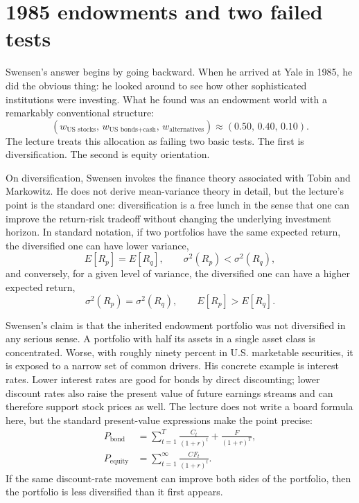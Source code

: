 \section{1985 endowments and two failed tests}

Swensen's answer begins by going backward. When he arrived at Yale in 1985, he did the obvious thing: he looked around to see how other sophisticated institutions were investing. What he found was an endowment world with a remarkably conventional structure:
\begin{equation}
\left(w_{\text{US stocks}},\,w_{\text{US bonds+cash}},\,w_{\text{alternatives}}\right)
\approx (0.50,\,0.40,\,0.10).
\end{equation}
The lecture treats this allocation as failing two basic tests. The first is diversification. The second is equity orientation.

On diversification, Swensen invokes the finance theory associated with Tobin and Markowitz. He does not derive mean-variance theory in detail, but the lecture's point is the standard one: diversification is a free lunch in the sense that one can improve the return-risk tradeoff without changing the underlying investment horizon. In standard notation, if two portfolios have the same expected return, the diversified one can have lower variance,
\begin{equation}
E[R_p]=E[R_q], \qquad \sigma^2(R_p)<\sigma^2(R_q),
\end{equation}
and conversely, for a given level of variance, the diversified one can have a higher expected return,
\begin{equation}
\sigma^2(R_p)=\sigma^2(R_q), \qquad E[R_p]>E[R_q].
\end{equation}

Swensen's claim is that the inherited endowment portfolio was not diversified in any serious sense. A portfolio with half its assets in a single asset class is concentrated. Worse, with roughly ninety percent in U.S. marketable securities, it is exposed to a narrow set of common drivers. His concrete example is interest rates. Lower interest rates are good for bonds by direct discounting; lower discount rates also raise the present value of future earnings streams and can therefore support stock prices as well. The lecture does not write a board formula here, but the standard present-value expressions make the point precise:
\begin{align}
P_{\text{bond}} &= \sum_{t=1}^{T}\frac{C_t}{(1+r)^t}+\frac{F}{(1+r)^T},\\
P_{\text{equity}} &= \sum_{t=1}^{\infty}\frac{CF_t}{(1+r)^t}.
\end{align}
If the same discount-rate movement can improve both sides of the portfolio, then the portfolio is less diversified than it first appears.

